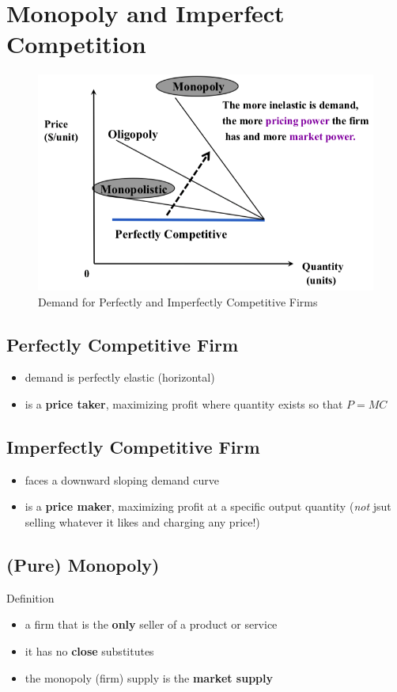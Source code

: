 \section{Monopoly and Imperfect Competition}
\begin{figure}[H]
	\includegraphics[width=\linewidth]{monopoly}
	\caption{Demand for Perfectly and Imperfectly Competitive Firms}
\end{figure}

\subsection{Perfectly Competitive Firm}
\begin{itemize}
	\item demand is perfectly elastic (horizontal)
	\item is a \textbf{price taker}, maximizing profit where quantity exists so that $P=MC$
\end{itemize}

\subsection{Imperfectly Competitive Firm}
\begin{itemize}
	\item faces a downward sloping demand curve
	\item is a \textbf{price maker}, maximizing profit at a specific output quantity (\textit{not} jsut selling whatever it likes and charging any price!)
\end{itemize}

\subsection{(Pure) Monopoly)}
\begin{note}{Definition}
	\begin{itemize}
		\item a firm that is the \textbf{only} seller of a product or service
		\item it has no \textbf{close} substitutes
		\item the monopoly (firm) supply is the \textbf{market supply}
	\end{itemize}
\end{note}

